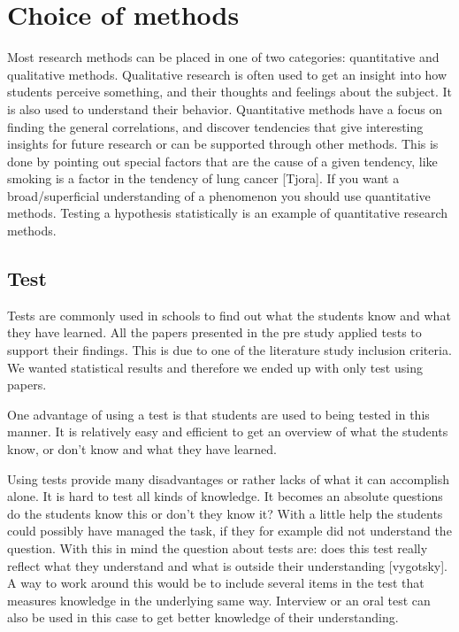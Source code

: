 \chapter{Choice of methods}
Most research methods can be placed in one of two categories: quantitative and qualitative methods. Qualitative research is often used to get an insight into how students perceive something, and their thoughts and feelings about the subject. It is also used to understand their behavior. Quantitative methods have a focus on finding the general correlations, and discover tendencies that give interesting insights for future research or can be supported through other methods. This is done by pointing out special factors that are the cause of a given tendency, like smoking is a factor in the tendency of lung cancer [Tjora]. If you want a broad/superficial understanding of a phenomenon you should use quantitative methods. Testing a hypothesis statistically is an example of quantitative research methods. 

\section{Test}
Tests are commonly used  in schools to find out what the students know and what they have learned. All the papers presented in the pre study applied tests to support their findings. This is due to one of the literature study inclusion criteria. We wanted statistical results and therefore we ended up with only test using papers. 

\bigskip\noindent
One advantage of using a test is that students are used to being tested in this manner. It is relatively easy and efficient to get an overview of what the students know, or don’t know and what they have learned.

\bigskip\noindent
Using tests provide many disadvantages or rather lacks of what it can accomplish alone. It is hard to test all kinds of knowledge. It becomes an absolute questions do the students know this or don’t they know it? With a little help the students could possibly have managed the task, if they for example did not understand the question. With this in mind the question about tests are: does this test really reflect what they understand and what is outside their understanding [vygotsky]. A way to work around this would be to include several items in the test that measures knowledge in the underlying same way. Interview or an oral test can also be used in this case to get better knowledge of their understanding.

